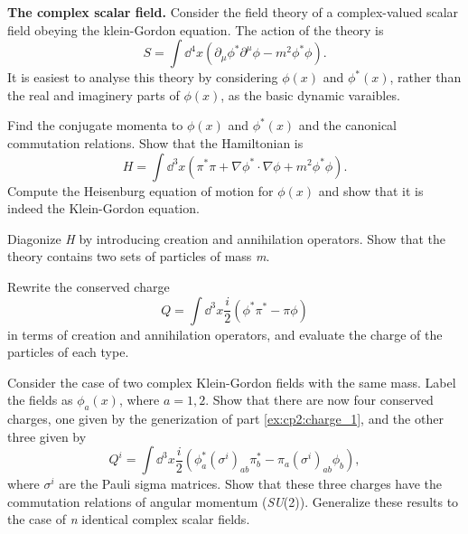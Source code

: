 \problem \textbf{The complex scalar field.} Consider the field theory of a complex-valued scalar field obeying 
the klein-Gordon equation. The action of the theory is
\begin{equation}\label{equ:cp2:s_csf}
    S = \int \dd^4x \left(\partial_\mu \phi^\ast \partial^\mu \phi - m^2 \phi^\ast \phi\right).
\end{equation}
It is easiest to analyse this theory by considering $\phi(x)$ and $\phi^\ast(x)$, rather than the real and imaginery
parts of $\phi(x)$, as the basic dynamic varaibles.
\begin{problembody}
    \item Find the conjugate momenta to $\phi(x)$ and $\phi^\ast(x)$ and the canonical commutation relations. Show 
    that the Hamiltonian is
    \begin{equation}\label{equ:cp2:h_csf}
        H = \int \dd^3x \left(\pi^\ast\pi + \nabla\phi^\ast \cdot \nabla\phi + m^2 \phi^\ast\phi\right).
    \end{equation}
    Compute the Heisenburg equation of motion for $\phi(x)$ and show that it is indeed the Klein-Gordon equation.
    
    \item Diagonize \textit{H} by introducing creation and annihilation operators. Show that the theory contains two 
    sets of particles of mass \textit{m}.
    
    \item \label{ex:cp2:charge_1} Rewrite the conserved charge
    \begin{equation}\label{equ:cp2:charge}
        Q = \int \dd^3x \frac{i}{2} \left(\phi^\ast \pi^\ast - \pi\phi\right)
    \end{equation}
    in terms of creation and annihilation operators, and evaluate the charge of the particles of each type.
    
    \item Consider the case of two complex Klein-Gordon fields with the same mass. Label the fields as $\phi_a(x)$,
    where $a = 1,2$. Show that there are now four conserved charges, one given by the generization of part \ref{ex:cp2:charge_1}, 
    and the other three given by
    \begin{equation}\label{equ:cp2:charge_2}
        Q^i = \int \dd^3x \frac{i}{2} (\phi^\ast_a (\sigma^i)_{ab} \pi^\ast_b - \pi_a (\sigma^i)_{ab} \phi_b),
    \end{equation}
    where $\sigma^i$ are the Pauli sigma matrices. Show that these three charges have the commutation relations of 
    angular momentum (\textit{SU}(2)). Generalize these results to the case of \textit{n} identical complex scalar 
    fields.
\end{problembody}

